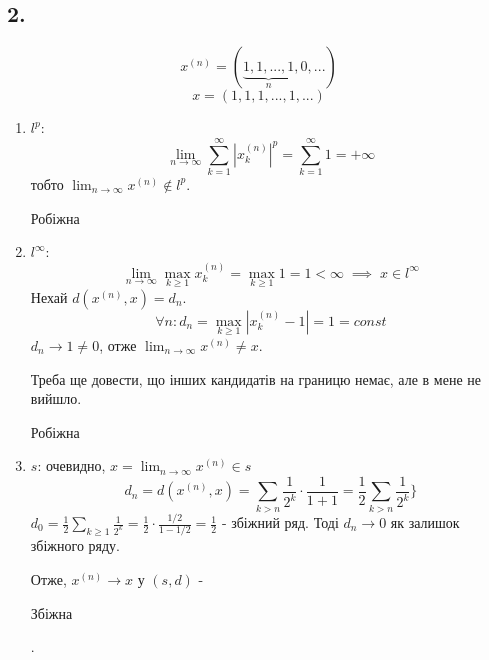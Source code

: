 \documentclass[11pt, a4paper]{article} %
\begin{document}
\subsection*{2.}
\begin{mdframed}
    \[x^{(n)} = (\underset{n}{\underbrace{1,1,...,1}},0,...)\]
    \[x = (1,1,1,...,1,...)\]
\end{mdframed}
\begin{enumerate}
    \item $l^p$: \[\lim_{n\to\infty} \sum_{k=1}^\infty |x^{(n)}_k|^p = \sum_{k=1}^\infty 1 = +\infty\]
    тобто $\lim_{n\to\infty} x^{(n)} \notin l^p$. \begin{mdframed}[backgroundcolor=red!20]
    Робіжна
    \end{mdframed}

    \item $l^\infty$: 
    \[\lim_{n\to\infty} \max_{k\ge1} x^{(n)}_k = \max_{k\ge1} 1  = 1 < \infty\; \implies \; x\in l^\infty \]
    Нехай $d(x^{(n)}, x) = d_n$.
    \[\forall n: d_n = \max_{k\ge1} |x^{(n)}_k-1| = 1 = const\]
    $d_n \to 1 \ne 0$, отже $\lim_{n\to\infty}x^{(n)} \ne x$.

    Треба ще довести, що інших кандидатів на границю немає, але в мене не вийшло.

    \begin{mdframed}[backgroundcolor=red!20]
    Робіжна
    \end{mdframed}


    \item $s$: очевидно, $x = \lim_{n\to\infty} x^{(n)} \in s$
    \[d_n = d(x^{(n)}, x) = \sum_{k>n} \frac{1}{2^k} \cdot \frac{1}{1+1} = \frac{1}{2}\sum_{k>n} \frac{1}{2^k}\}\]
    $d_0 = \frac{1}{2}\sum_{k\ge 1} \frac{1}{2^k} = \frac{1}{2} \cdot \frac{1/2}{1-1/2} = \frac{1}{2}$ - збіжний ряд.
    Тоді $d_n \longrightarrow 0$ як залишок збіжного ряду.
    
    Отже, $x^{(n)} \longrightarrow x$ у $(s,d)$ - \begin{mdframed}[style=ans]
    Збіжна
    \end{mdframed}. 
\end{enumerate}
\pagebreak
\end{document}
